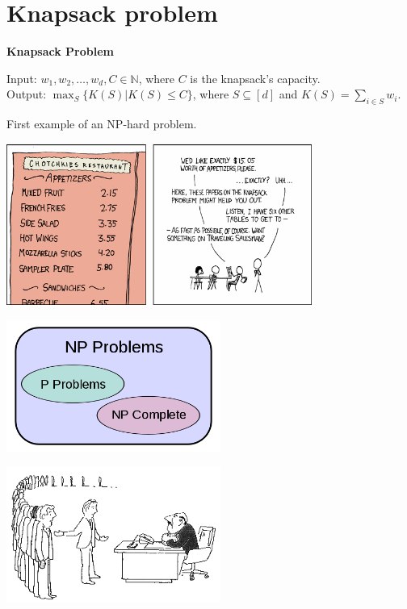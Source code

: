\section{Knapsack problem}

\begin{frame}
{\bf Knapsack Problem}

Input: $w_1,w_2,\ldots,w_d,C\in\mathbb{N}$, where $C$ is the
knapsack's capacity. \\
Output: $\max_S\{K(S) | K(S) \leq C \}$, where
$S\subseteq[d]$ and $K(S)=\sum_{i\in S}w_i$.
\end{frame}

\begin{frame}
First example of an NP-hard problem.
\end{frame}

\begin{frame}
\begin{center}
\includegraphics[width=10cm]{Figures/joke1.png}
\end{center}
\end{frame}

\begin{frame}
\begin{center}
\includegraphics[width=7cm]{Figures/pnp.png}
\end{center}
\end{frame}

\begin{frame}
\begin{center}
\includegraphics[width=7cm]{Figures/joke2.png}
\end{center}
\end{frame}


